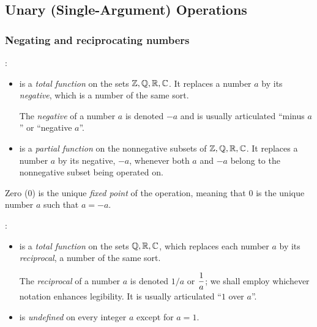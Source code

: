 \subsection{Unary (Single-Argument) Operations}
\label{sec:unary-ops}

\subsubsection{Negating and reciprocating numbers}
 

:
\begin{itemize}
\item
is a {\em total function} on the sets $\mathbb{Z}, \mathbb{Q}, \mathbb{R}, \mathbb{C}$.  It replaces a number $a$ by its {\em negative}, which is a number of the same sort.

\smallskip

The {\it negative} of a number $a$ is denoted $-a$ and is usually articulated ``minus $a$'' or ``negative $a$''.
\item
is a {\em partial function} on the nonnegative subsets of $\mathbb{Z}, \mathbb{Q}, \mathbb{R}, \mathbb{C}$.  It replaces a number $a$ by its negative, $-a$, whenever both $a$ and $-a$ belong to the nonnegative subset being
operated on.
\end{itemize}
Zero ($0$) is the unique {\it fixed point} of the operation, meaning that $0$ is the unique number $a$ such that $a = -a$.

\medskip

 

:
\begin{itemize}
\item
is a {\em total function} on the sets $\mathbb{Q}, \mathbb{R}, \mathbb{C}$, which replaces each number $a$ by its {\em reciprocal}, a number of the same sort.

\smallskip

The {\it reciprocal} of  a number $a$ is denoted $1/a$ or $\displaystyle {1 \over a}$; we shall employ whichever notation enhances legibility.  It is usually articulated ``$1$ over $a$''.

\item
is {\em undefined} on every integer $a$ except for $a=1$.
\end{itemize}

